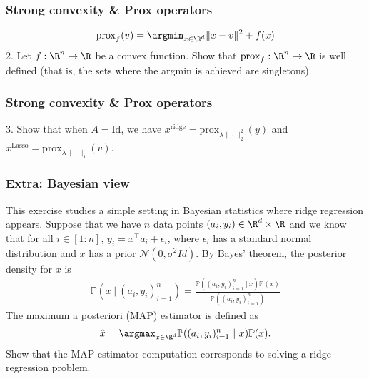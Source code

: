 \documentclass{beamer}
\begin{document}
\begin{frame}[t]
\frametitle{Strong convexity \& Prox operators}
\vspace{-25pt}
\begin{align*}
\text{prox}_f(v) = \argmin_{x \in \R^d} \|x-v\|^2 + f(x)
\end{align*}
2. Let $f : \R^n \rightarrow \R$ be a convex function. Show that $\text{prox}_f : \R^n \rightarrow \R$ is well defined (that is, the sets where the argmin is achieved are singletons).
\end{frame}

\begin{frame}[t]
\frametitle{Strong convexity \& Prox operators}
\vspace{-5pt}
3. Show that when $A=\text{Id}$, we have $x^{\text{ridge}} = \text{prox}_{\lambda \|\cdot\|_2^2}(y)$ and $x^{\text{Lasso}} = \text{prox}_{\lambda \|\cdot\|_1}(v)$.
\end{frame}
\fi

\begin{frame}[t]
\frametitle{Extra: Bayesian view}
\vspace{-5pt}
This exercise studies a simple setting in Bayesian statistics where ridge regression appears. Suppose that we have $n$ data points $(a_i, y_i) \in \R^{d} \times \R$ and we know that for all $i \in [1:n]$, $y_i = x^\top a_i + \epsilon_i$, where $\epsilon_i$ has a standard normal distribution and $x$ has a prior $\mathcal{N}(0, \sigma^2 Id)$. By Bayes' theorem, the posterior density for $x$ is 
\begin{align*}
\mathbb{P}( x \ | \ (a_i, y_i)_{i=1}^n ) = \frac{\mathbb{P}((a_i, y_i)_{i=1}^n \ | \ x ) \mathbb{P}(x )}{\mathbb{P}((a_i, y_i)_{i=1}^n)}
\end{align*}
The maximum a posteriori (MAP) estimator is defined as
\begin{align*}
\hat{x} = \argmax_{x \in \R^d} \mathbb{P}((a_i, y_i)_{i=1}^n \ | \ x ) \mathbb{P}(x ).
\end{align*}
Show that the MAP estimator computation corresponds to solving a ridge regression problem.
\end{frame}

\begin{frame}[t]
\pause
\pause
\pause
\end{frame}
\end{document}
